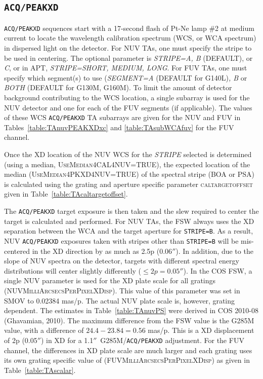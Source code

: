 \documentclass[12pt]{article}
\newcommand{\arcsec}{\ensuremath{''}}
\begin{document}
\clearpage
\vspace{-0.3cm}
\vspace{-0.3cm}
\subsection{\texttt{ACQ/PEAKXD}}
\texttt{ACQ/PEAKXD} sequences start with a 17-second flash of Pt-Ne lamp \#2 at medium current to locate the wavelength calibration spectrum (WCS, or WCA spectrum) in dispersed light on the detector.
For NUV TAs, one must specify the stripe to be used in centering.
The optional parameter is {\it STRIPE=A, B} (DEFAULT), or {\it C}, or in APT, {\it STRIPE=SHORT, MEDIUM, LONG}.
For FUV TAs, one must specify which segment(s) to use ({\it SEGMENT=A} (DEFAULT for G140L){\it, B} or {\it BOTH} (DEFAULT for G130M, G160M).
To limit the amount of detector background contributing to the WCS location, a single subarray is used for the NUV detector and one for each of the FUV segments (if applicable).
The values of these WCS \texttt{ACQ/PEAKXD} TA subarrays are given for the NUV and FUV in Tables~\ref{table:TAnuvPEAKXDxc} and \ref{table:TAsubWCAfuv} for the FUV channel.

Once the XD location of the NUV WCS for the {\it STRIPE} selected is determined (using a
median, \textsc{UseMedian4CAL4NUV=TRUE}), the expected location of the median (\textsc{UseMedian4PKXD4NUV=TRUE})
of the spectral stripe (BOA or PSA) is calculated using the grating and aperture specific parameter \textsc{caltargetoffset} given in
Table~\ref{table:TAcaltargetoffset}.

The \texttt{ACQ/PEAKXD} target exposure is then taken and the slew required to center the target is calculated and performed.
For NUV TAs, the FSW always uses the XD separation between the WCA and the target aperture for \texttt{STRIPE=B}.  As a result,
NUV \texttt{ACQ/PEAKXD} exposures taken with stripes other than \texttt{STRIPE=B} will be mis-centered in the XD direction
by as much as 2.5p (0.06\arcsec).
In addition, due to the slope of NUV spectra on the detector, targets with different spectral energy distributions will
center slightly differently ($\leq 2p = 0.05$\arcsec).
In the COS FSW, a single NUV parameter is used for the XD plate scale
for all gratings (\textsc{NUVMilliArcsecsPerPixelXDisp}).
This value of this parameter was set in SMOV to 0.02384 mas/p.
The actual NUV plate scale is, however, grating dependent.
The estimates in Table~\ref{table:TAnuvPS} were derived in COS 2010-08 (Ghavamian, 2010).
The maximum difference from the FSW value is the G285M value, with a difference of $24.4-23.84 = 0.56$ mas/p.
This is a XD displacement of 2p (0.05\arcsec) in XD for a 1.1\arcsec\ G285M/\texttt{ACQ/PEAKXD} adjustment.
For the FUV channel, the differences in XD plate scale are much larger and each grating
uses its own grating specific value of (\textsc{FUVMilliArcsecsPerPixelXDisp}) as given in Table~\ref{table:TAscalar}.
\end{document}

